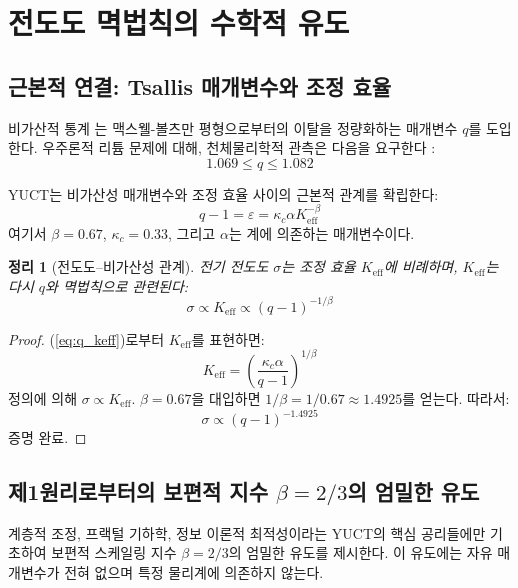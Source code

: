 \documentclass[11pt,a4paper]{article}
\newcommand{\Ke}{K_{\mathrm{eff}}}
\newcommand{\kappac}{\kappa_c}
\newcommand{\alp}{\alpha}
\newtheorem{theorem}{정리}[section]
\theoremstyle{remark}
\begin{document}
	\section{전도도 멱법칙의 수학적 유도}
	
	\subsection{근본적 연결: Tsallis 매개변수와 조정 효율}
	
	비가산적 통계 \cite{tsallis1988}는 맥스웰-볼츠만 평형으로부터의 이탈을 정량화하는 매개변수 \(q\)를 도입한다. 우주론적 리튬 문제에 대해, 천체물리학적 관측은 다음을 요구한다 \cite{bertulani2015}:
	\begin{equation}
		1.069 \le q \le 1.082
		\label{eq:q_range}
	\end{equation}
	
	YUCT는 비가산성 매개변수와 조정 효율 사이의 근본적 관계를 확립한다:
	\begin{equation}
		q - 1 = \varepsilon = \kappac \alp \Ke^{-\beta}
		\label{eq:q_keff}
	\end{equation}
	여기서 \(\beta = 0.67\), \(\kappac = 0.33\), 그리고 \(\alp\)는 계에 의존하는 매개변수이다.
	
	\begin{theorem}[전도도–비가산성 관계]
		전기 전도도 \(\sigma\)는 조정 효율 \(\Ke\)에 비례하며, \(\Ke\)는 다시 \(q\)와 멱법칙으로 관련된다:
		\begin{equation}
			\sigma \propto \Ke \propto (q-1)^{-1/\beta}
			\label{eq:sigma_q}
		\end{equation}
		\label{th:conductivity}
	\end{theorem}
	
	\begin{proof}
		(\ref{eq:q_keff})로부터 \(\Ke\)를 표현하면:
		\[
		\Ke = \left( \frac{\kappac \alp}{q-1} \right)^{1/\beta}
		\]
		정의에 의해 \(\sigma \propto \Ke\). \(\beta = 0.67\)을 대입하면 \(1/\beta = 1/0.67 \approx 1.4925\)를 얻는다. 따라서:
		\[
		\sigma \propto (q-1)^{-1.4925}
		\]
		증명 완료.
	\end{proof}
	
	\subsection{제1원리로부터의 보편적 지수 \(\beta = 2/3\)의 엄밀한 유도}
	\label{subsec:beta_derivation}
	
	계층적 조정, 프랙털 기하학, 정보 이론적 최적성이라는 YUCT의 핵심 공리들에만 기초하여 보편적 스케일링 지수 \(\beta = 2/3\)의 엄밀한 유도를 제시한다. 이 유도에는 자유 매개변수가 전혀 없으며 특정 물리계에 의존하지 않는다.
	
\end{document}
